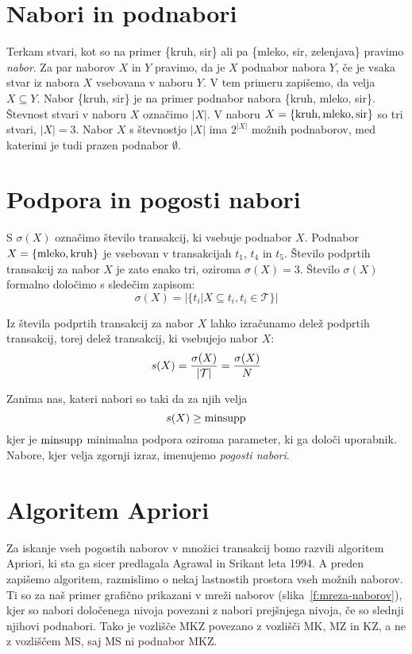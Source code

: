\section{Nabori in podnabori}

Terkam stvari, kot so na primer \{kruh, sir\} ali pa \{mleko, sir, zelenjava\} pravimo {\em nabor}. Za par naborov $X$ in $Y$ pravimo, da je $X$ podnabor nabora $Y$, če je vsaka stvar iz nabora $X$ vsebovana v naboru $Y$. V tem primeru zapišemo, da velja $X\subseteq Y$. Nabor \{kruh, sir\} je na primer podnabor nabora \{kruh, mleko, sir\}. Števnost stvari v naboru $X$ označimo $|X|$. V naboru $X=\{{\rm kruh}, {\rm mleko}, {\rm sir}\}$ so tri stvari, $|X|=3$. Nabor $X$ s števnostjo $|X|$ ima $2^{|X|}$ možnih podnaborov, med katerimi je tudi prazen podnabor $\emptyset$.

\section{Podpora in pogosti nabori}

S $\sigma(X)$ označimo število transakcij, ki vsebuje podnabor $X$. Podnabor $X=\{{\rm mleko}, {\rm kruh}\}$ je vsebovan v transakcijah $t_1$, $t_4$ in $t_5$. Število podprtih transakcij za nabor $X$ je zato enako tri, oziroma $\sigma(X)=3$. Število $\sigma(X)$ formalno določimo s sledečim zapisom:
%
\begin{equation}
  \sigma(X)=|\{t_i|X\subseteq t_i, t_i\in {\mathcal T}\}|
\end{equation}

Iz števila podprtih transakcij za nabor $X$ lahko izračunamo delež podprtih transakcij, torej delež transakcij, ki vsebujejo nabor $X$:
%
\begin{equation}
  s(X)={\sigma(X)\over |{\mathcal T}|}={\sigma(X)\over N}
\end{equation}

Zanima nas, kateri nabori so taki da za njih velja
\begin{equation}
  s(X)\geq{\rm minsupp}
\end{equation}
kjer je ${\rm minsupp}$ minimalna podpora oziroma parameter, ki ga določi uporabnik. Nabore, kjer velja zgornji izraz, imenujemo {\em pogosti nabori}.

\section{Algoritem Apriori}

Za iskanje vseh pogostih naborov v množici transakcij bomo razvili algoritem Apriori, ki sta ga sicer predlagala Agrawal in Srikant leta 1994. A preden zapišemo algoritem, razmislimo o nekaj lastnostih prostora vseh možnih naborov. Ti so za naš primer grafično prikazani v mreži naborov (slika~\ref{f:mreza-naborov}), kjer so nabori določenega nivoja povezani z nabori prejšnjega nivoja, če so slednji njihovi podnabori. Tako je vozlišče MKZ povezano z vozlišči MK, MZ in KZ, a ne z vozliščem MS, saj MS ni podnabor MKZ.

